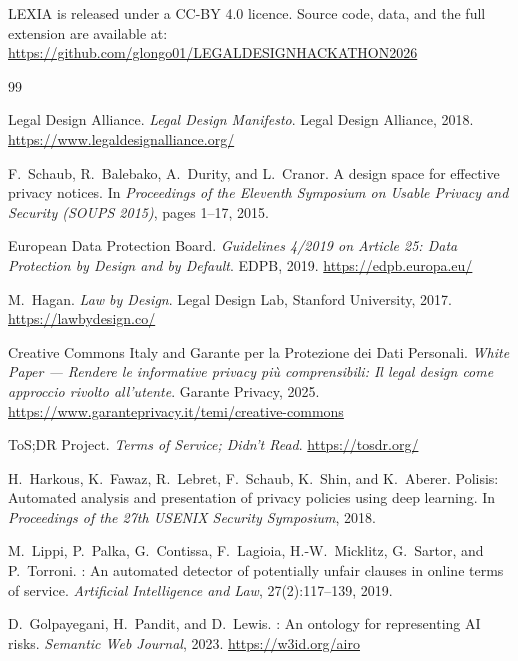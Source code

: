 \documentclass[12pt, a4paper]{article}
\begin{document}
LEXIA is released under a CC-BY 4.0 licence. Source code, data, and the full extension are available at: \url{https://github.com/glongo01/LEGALDESIGNHACKATHON2026}

\begin{thebibliography}{99}

Legal Design Alliance.
\newblock \emph{Legal Design Manifesto}.
\newblock Legal Design Alliance, 2018.
\newblock \url{https://www.legaldesignalliance.org/}

F.\ Schaub, R.\ Balebako, A.\ Durity, and L.\ Cranor.
\newblock A design space for effective privacy notices.
\newblock In \emph{Proceedings of the Eleventh Symposium on Usable Privacy and
Security (SOUPS 2015)}, pages 1--17, 2015.

European Data Protection Board.
\newblock \emph{Guidelines 4/2019 on Article 25: Data Protection by Design and
by Default}.
\newblock EDPB, 2019.
\newblock \url{https://edpb.europa.eu/}

M.\ Hagan.
\newblock \emph{Law by Design}.
\newblock Legal Design Lab, Stanford University, 2017.
\newblock \url{https://lawbydesign.co/}

Creative Commons Italy and Garante per la Protezione dei Dati Personali.
\newblock \emph{White Paper --- Rendere le informative privacy più
comprensibili: Il legal design come approccio rivolto all'utente}.
\newblock Garante Privacy, 2025.
\newblock \url{https://www.garanteprivacy.it/temi/creative-commons}

ToS;DR Project.
\newblock \emph{Terms of Service; Didn't Read}.
\newblock \url{https://tosdr.org/}

H.\ Harkous, K.\ Fawaz, R.\ Lebret, F.\ Schaub, K.\ Shin, and K.\ Aberer.
\newblock Polisis: Automated analysis and presentation of privacy policies
using deep learning.
\newblock In \emph{Proceedings of the 27th USENIX Security Symposium}, 2018.

M.\ Lippi, P.\ Palka, G.\ Contissa, F.\ Lagioia, H.-W.\ Micklitz,
G.\ Sartor, and P.\ Torroni.
: An automated detector of potentially unfair clauses in
online terms of service.
\newblock \emph{Artificial Intelligence and Law}, 27(2):117--139, 2019.

D.\ Golpayegani, H.\ Pandit, and D.\ Lewis.
: An ontology for representing {AI} risks.
\newblock \emph{Semantic Web Journal}, 2023.
\newblock \url{https://w3id.org/airo}


\end{thebibliography}
\end{document}
